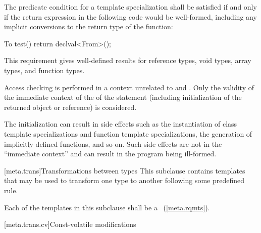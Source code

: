 %
\pnum
The predicate condition for a template specialization 
shall be satisfied if and only if the return expression in the following code would be
well-formed, including any implicit conversions to the return type of the function:

\begin{codeblock}
To test() {
  return declval<From>();
}
\end{codeblock}

\begin{note} This requirement gives well-defined results for reference types, void
types, array types, and function types.\end{note} Access checking is performed
in a context unrelated to  and . Only the validity of
the immediate context of the  of the  statement
(including initialization of the returned object or reference) is considered. \begin{note} The
initialization can result in side effects such as the
instantiation of class template specializations and function template
specializations, the generation of implicitly-defined functions, and so on. Such
side effects are not in the ``immediate context'' and can result in the program
being ill-formed. \end{note}

[meta.trans]{Transformations between types}
\pnum
This subclause contains templates that may be used to transform one
type to another following some predefined rule.

\pnum
Each of the templates in this subclause shall be a
~(\ref{meta.rqmts}).

[meta.trans.cv]{Const-volatile modifications}

